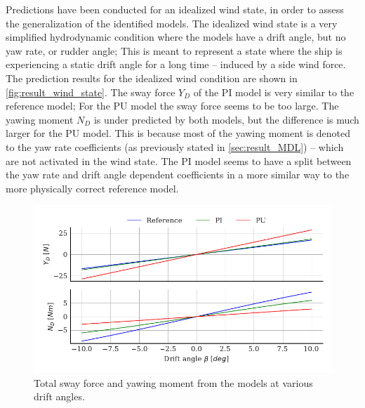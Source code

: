 Predictions have been conducted for an idealized wind state, in order to assess the generalization of the  identified models. The idealized wind state is a very simplified hydrodynamic condition where the models have a drift angle, but no yaw rate, or rudder angle; This is meant to represent a state where the ship is experiencing a static drift angle for a long time -- induced by a side wind force.
The prediction results for the idealized wind condition are shown in \autoref{fig:result_wind_state}. The sway force $Y_D$ of the PI model is very similar to the reference model; For the PU model the sway force seems to be too large. The yawing moment $N_D$ is under predicted by both models, but the difference is much larger for the PU model. 
This is because most of the yawing moment is denoted to the yaw rate coefficients (as previously stated in \autoref{sec:result_MDL}) -- which are not activated in the wind state. 
The PI model seems to have a split between the yaw rate and drift angle dependent coefficients in a more similar way to the more physically correct reference model.
\label{sec:wind_state}
\begin{figure}[h!]
    \includegraphics{figures/result_wind_state.forces.pdf}
    \caption{Total sway force and yawing moment from the models at various drift angles.}
    \label{fig:result_wind_state}
\end{figure}